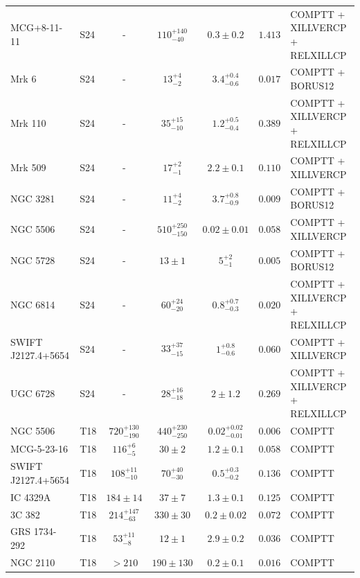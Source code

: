 \begin{longtable}{llcccll}
MCG+8-11-11 & S24 & - & $110^{+140}_{-40}$ & $0.3\pm0.2$ & $1.413$ & COMPTT + XILLVERCP + RELXILLCP \\
Mrk 6 & S24 & - & $13^{+4}_{-2}$ & $3.4^{+0.4}_{-0.6}$ & $0.017$ & COMPTT + BORUS12 \\
Mrk 110 & S24 & - & $35^{+15}_{-10}$ & $1.2^{+0.5}_{-0.4}$ & $0.389$ & COMPTT + XILLVERCP + RELXILLCP \\
Mrk 509 & S24 & - & $17^{+2}_{-1}$ & $2.2\pm0.1$ & $0.110$ & COMPTT + XILLVERCP \\
NGC 3281 & S24 & - & $11^{+4}_{-2}$ & $3.7^{+0.8}_{-0.9}$ & $0.009$ & COMPTT + BORUS12 \\
NGC 5506 & S24 & - & $510^{+250}_{-150}$ & $0.02\pm0.01$ & $0.058$ & COMPTT + XILLVERCP \\
NGC 5728 & S24 & - & $13\pm1$ & $5^{+2}_{-1}$ & $0.005$ & COMPTT + BORUS12 \\
NGC 6814 & S24 & - & $60^{+24}_{-20}$ & $0.8^{+0.7}_{-0.3}$ & $0.020$ & COMPTT + XILLVERCP + RELXILLCP \\
SWIFT J2127.4+5654 & S24 & - & $33^{+37}_{-15}$ & $1^{+0.8}_{-0.6}$ & $0.060$ & COMPTT + XILLVERCP \\
UGC 6728 & S24 & - & $28^{+16}_{-18}$ & $2\pm1.2$ & $0.269$ & COMPTT + XILLVERCP + RELXILLCP \\
\midrule
NGC 5506 & T18 & $720^{+130}_{-190}$ & $440^{+230}_{-250}$ & $0.02^{+0.02}_{-0.01}$ & $0.006$ & COMPTT \\
MCG-5-23-16 & T18 & $116^{+6}_{-5}$ & $30\pm2$ & $1.2\pm0.1$ & $0.058$ & COMPTT \\
SWIFT J2127.4+5654 & T18 & $108^{+11}_{-10}$ & $70^{+40}_{-30}$ & $0.5^{+0.3}_{-0.2}$ & $0.136$ & COMPTT \\
IC 4329A & T18 & $184\pm14$ & $37\pm7$ & $1.3\pm0.1$ & $0.125$ & COMPTT \\
3C 382 & T18 & $214^{+147}_{-63}$ & $330\pm30$ & $0.2\pm0.02$ & $0.072$ & COMPTT \\
GRS 1734-292 & T18 & $53^{+11}_{-8}$ & $12\pm1$ & $2.9\pm0.2$ & $0.036$ & COMPTT \\
NGC 2110 & T18 & $>210$ & $190\pm130$ & $0.2\pm0.1$ & $0.016$ & COMPTT \\
\end{longtable}
\endgroup
